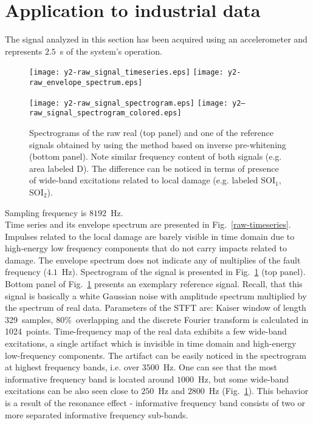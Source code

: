 \documentclass[11pt]{article} %
\begin{document}
\section{Application to industrial data}\label{real_data}
The signal analyzed in this section has been acquired using an accelerometer and represents $2.5$~s of the system's operation.
\begin{figure}[!ht]
\begin{center}
\texttt{[image: y2-raw\_signal\_timeseries.eps]}
\texttt{[image: y2-raw\_envelope\_spectrum.eps]}
\caption{Time series (top panel) and envelope spectrum (bottom panel) of the real raw vibration signal from the two-stage gearbox. Red dashed lines denote 14 first multiplies of fault frequency (4.1~Hz).\label{raw-timeseries}}
\texttt{[image: y2-raw\_signal\_spectrogram.eps]}
\texttt{[image: y2--raw\_signal\_spectrogram\_colored.eps]}
\caption{Spectrograms of the raw real (top panel) and one of the reference signals obtained by using the method based on inverse pre-whitening (bottom panel). Note similar frequency content of both signals (e.g. area labeled D). The difference can be noticed in terms of presence of wide-band excitations related to local damage (e.g. labeled SOI$_1$, SOI$_2$).\label{coloring-stft}}
\end{center}
\end{figure}
Sampling frequency is $8192$~Hz.\\
Time series and its envelope spectrum are presented in Fig.~\ref{raw-timeseries}. Impulses related to the local damage are barely visible in time domain due to high-energy low frequency components that do not carry impacts related to damage. The envelope spectrum does not indicate any of multiplies of the fault frequency ($4.1$~Hz). Spectrogram of the signal is presented in Fig.~\ref{coloring-stft} (top panel). Bottom panel of Fig.~\ref{coloring-stft} presents an exemplary reference signal. Recall, that this signal is basically a white Gaussian noise with amplitude spectrum multiplied by the spectrum of real data. Parameters of the STFT are: Kaiser window of length 329~samples, $80\%$~overlapping and the discrete Fourier transform is calculated in 1024~points. Time-frequency map of the real data exhibits a few wide-band excitations, a single artifact which is invisible in time domain and high-energy low-frequency components. The artifact can be easily noticed in the spectrogram at highest frequency bands, i.e. over $3500$~Hz. One can see that the most informative frequency band is located around $1000$~Hz, but some wide-band excitations can be also seen close to $250$~Hz and $2800$~Hz (Fig.~\ref{coloring-stft}). This behavior is a result of the resonance effect - informative frequency band consists of two or more separated informative frequency sub-bands.\\
\end{document}
